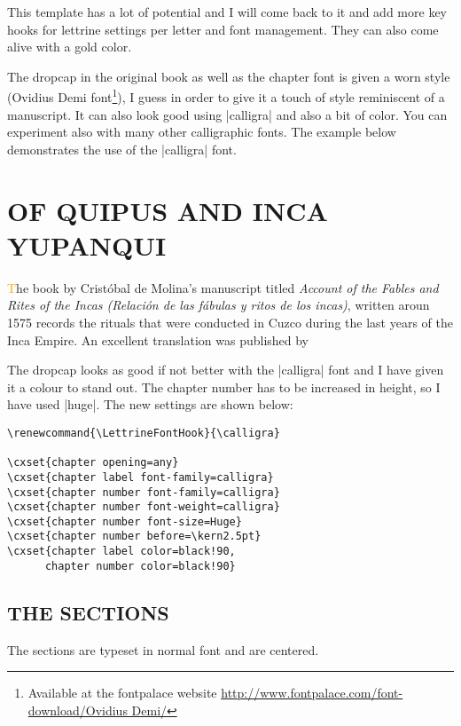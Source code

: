 This template has a lot of potential and I will come back to it and add more key hooks for lettrine settings per letter and font management. They can also come alive with a gold color.

The dropcap in the original book as well as the chapter font is given a worn style (Ovidius Demi font\footnote{Available at the fontpalace website \protect\url{http://www.fontpalace.com/font-download/Ovidius Demi/}}), I guess in order to give it a touch of style reminiscent of a manuscript. It can also look
good using |calligra| and also a bit of color. You can experiment also with many other calligraphic fonts. The example below demonstrates the use of the |calligra| font.
\bigskip

\renewcommand{\LettrineFontHook}{\calligra}
\bigskip


\chapter{OF QUIPUS AND INCA YUPANQUI}

\lettrine[loversize=.6]{\textcolor{orange}{T}}{}he book by Crist\'obal de Molina’s manuscript titled \emph{Account of the Fables and Rites of the Incas (Relación
de las fábulas y ritos de los incas)}, written aroun 1575 records the rituals that were conducted in Cuzco during the last years of the Inca Empire. An excellent translation was published by
\medskip

The dropcap looks as good if not better with the |calligra| font and I have given it a colour to stand out. The chapter number has to be increased in height, so I have used |huge|. The new
settings are shown below:

\begin{verbatim}
\renewcommand{\LettrineFontHook}{\calligra}

\cxset{chapter opening=any}
\cxset{chapter label font-family=calligra}
\cxset{chapter number font-family=calligra}
\cxset{chapter number font-weight=calligra}
\cxset{chapter number font-size=Huge}
\cxset{chapter number before=\kern2.5pt}
\cxset{chapter label color=black!90,
      chapter number color=black!90}
\end{verbatim}



\section{THE SECTIONS}

The sections are typeset in normal font and are centered.

{\ovidius \lorem}

\bottomline 
